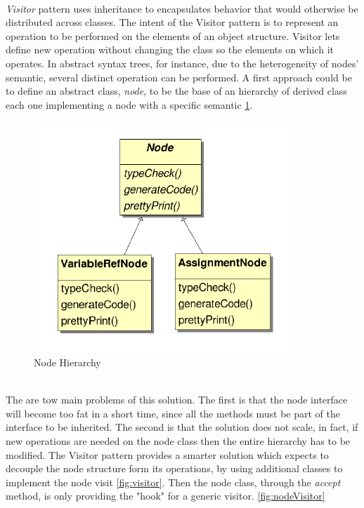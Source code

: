 \paragraph{} \textit{Visitor} pattern uses inheritance to encapsulates behavior that would otherwise be distributed across classes. The intent of the Visitor pattern is to represent an operation to be performed on the elements of an object structure. Visitor lets define new operation without changing the class so the elements on which it operates. In abstract syntax trees, for instance, due to the heterogeneity of nodes' semantic, several distinct operation can be performed. A first approach could be to define an abstract class, \textit{node}, to be the base of an hierarchy of derived class each one implementing a node with a specific semantic \ref{fig:nodehierarchy}.
\begin{figure}[!h]
\centering
\includegraphics[width=.35\textwidth]{Figs/nodesimple.PNG}
\caption{Node Hierarchy}
\label{fig:nodehierarchy}
\end{figure}
\noindent
\\
The are tow main problems of this solution. The first is that the node interface will become too fat in a short time, since all the methods must be part of the interface to be inherited. The second is that the solution does not scale, in fact, if new operations are needed on the node class then the entire hierarchy has to be modified. The Visitor pattern provides a smarter solution which expects to decouple the node structure form its operations, by using additional classes to implement the node visit \ref{fig:visitor}. Then the node class, through the \textit{accept} method, is only providing the "hook" for a generic visitor. \ref{fig:nodeVisitor}

